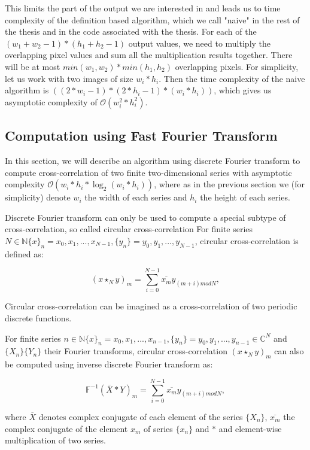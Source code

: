This limits the part of the output we are interested in and leads us to time complexity of the definition based algorithm, which we call "naive" in the rest of the thesis and in the code associated with the thesis. For each of the $(w_1 + w_2 - 1) * (h_1 + h_2 - 1)$ output values, we need to multiply the overlapping pixel values and sum all the multiplication results together. There will be at most $min(w_1, w_2) * min(h_1, h_2)$ overlapping pixels. For simplicity, let us work with two images of size $w_i*h_i$. Then the time complexity of the naive algorithm is $((2*w_i-1)*(2 * h_i - 1) * (w_i * h_i))$, which gives us asymptotic complexity of $\mathcal{O}(w_i^2*h_i^2)$.

\subsection{Computation using Fast Fourier Transform}
\label{sec:cross_corr_fft}

In this section, we will describe an algorithm using discrete Fourier transform to compute cross-correlation of two finite two-dimensional series with asymptotic complexity $\mathcal{O}(w_i*h_i*\log_2(w_i*h_i))$, where as in the previous section we (for simplicity) denote $w_i$ the width of each series and $h_i$ the height of each series.

Discrete Fourier transform can only be used to compute a special subtype of cross-correlation, so called circular cross-correlation
For finite series $N \in \mathbb{N} \{x\}_n = x_0, x_1, ..., x_{N-1}, \{y_n\} = y_0, y_1, ..., y_{N-1}$, circular cross-correlation is defined as:

\[
(x \star_N y)_m = \sum_{i=0}^{N-1} \overline{x_m} y_{(m + i) mod N},
\]

Circular cross-correlation can be imagined as a cross-correlation of two periodic discrete functions.

For finite series $n \in \mathbb{N} \{x\}_n = x_0, x_1, ..., x_{n-1}, \{y_n\} = y_0, y_1, ..., y_{n-1} \in \mathbb{C}^N$ and $\{X_n\} \{Y_n\}$ their Fourier transforms, circular cross-correlation $(x \star_N y)_m$ can also be computed using inverse discrete Fourier transform as:

\[
\mathbb{F}^{-1}(\overline{X}*{Y})_m = \sum_{i=0}^{N-1}  \overline{x_m} y_{(m + i) mod N},
\]

where $\overline{X}$ denotes complex conjugate of each element of the series $\{X_n\}$, $\overline{x_m}$ the complex conjugate of the element $x_m$ of series $\{x_n\}$ and $*$ and element-wise multiplication of two series.


